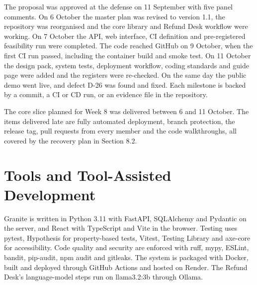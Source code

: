 \documentclass{fast-nuces-bs}
\begin{document}
The proposal was approved at the defense on 11 September with five panel comments. On 6 October the master plan was revised to version 1.1, the repository was reorganised and the core library and Refund Desk workflow were working. On 7 October the API, web interface, CI definition and pre-registered feasibility run were completed. The code reached GitHub on 9 October, when the first CI run passed, including the container build and smoke test. On 11 October the design pack, system tests, deployment workflow, coding standards and guide page were added and the registers were re-checked. On the same day the public demo went live, and defect D-26 was found and fixed. Each milestone is backed by a commit, a CI or CD run, or an evidence file in the repository.

The core slice planned for Week 8 was delivered between 6 and 11 October. The items delivered late are fully automated deployment, branch protection, the release tag, pull requests from every member and the code walkthroughs, all covered by the recovery plan in Section 8.2.

\section{Tools and Tool-Assisted Development}

Granite is written in Python 3.11 with FastAPI, SQLAlchemy and Pydantic on the server, and React with TypeScript and Vite in the browser. Testing uses pytest, Hypothesis for property-based tests, Vitest, Testing Library and axe-core for accessibility. Code quality and security are enforced with ruff, mypy, ESLint, bandit, pip-audit, npm audit and gitleaks. The system is packaged with Docker, built and deployed through GitHub Actions and hosted on Render. The Refund Desk's language-model steps run on llama3.2:3b through Ollama.
\end{document}
